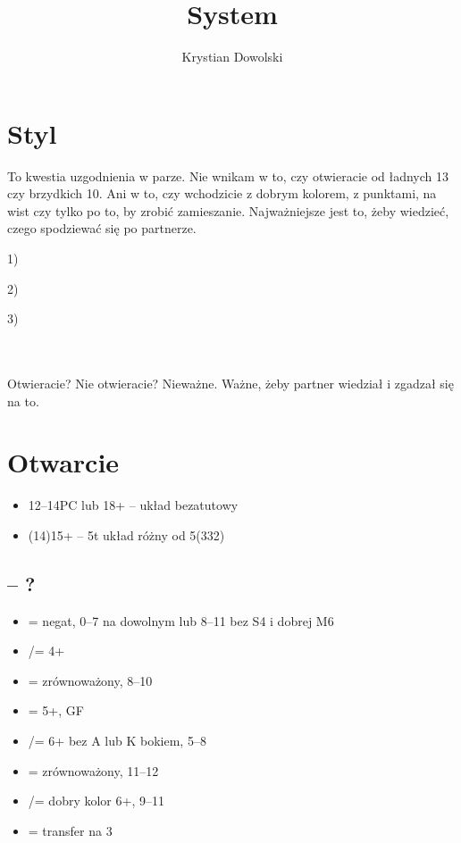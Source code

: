 \documentclass[12pt]{article}
\title{System}
\author{Krystian Dowolski}
\begin{document}
\tableofcontents
\newpage

\section{Styl}
To kwestia uzgodnienia w parze. Nie wnikam w to, czy otwieracie od ładnych 13 czy brzydkich 10. Ani w to, czy wchodzicie z dobrym kolorem, z punktami, na wist czy tylko po to, by zrobić zamieszanie. Najważniejsze jest to, żeby wiedzieć, czego spodziewać się po partnerze.

\vspace*{0.7cm}
1)
\begin{minipage}[t]{0.25\textwidth}
\end{minipage}%
2)
\begin{minipage}[t]{0.25\textwidth}
\end{minipage}%
3)
\begin{minipage}[t]{0.25\textwidth}
\end{minipage}%
\\\\
Otwieracie? Nie otwieracie? Nieważne. Ważne, żeby partner wiedział i zgadzał się na to.
\newpage
\section{Otwarcie \texorpdfstring{\Cs[1]}{1C}}
\begin{itemize}
    \item 12–14PC lub 18+ – układ bezatutowy
    \item (14)15+  – 5t układ różny od 5(332)
\end{itemize}
\subsection{\texorpdfstring{\Cs[1] – ?}{1C - ?}}
\begin{itemize}
    \item \Ds[1] = negat, 0–7 na dowolnym lub 8–11 bez S4 i dobrej M6
    \item \Hs[1]/\Ss[] = 4+
    \item \NT[1] = zrównoważony, 8–10
    \item \Cs[2] = 5+\Cs, GF
    \item \Hs[2]/\Ss = 6+ bez A lub K bokiem, 5–8
    \item \NT[2] = zrównoważony, 11–12
    \item \Cs[3]/\Ds = dobry kolor 6+, 9–11
    \item \Ss[3] = transfer na 3\NT
\end{itemize}
\newpage
\end{document}
